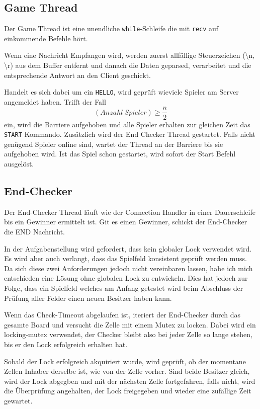 \subsection{Game Thread}
Der Game Thread ist eine unendliche \texttt{while}-Schleife die mit \texttt{recv} auf einkommende Befehle hört.

Wenn eine Nachricht Empfangen wird, werden zuerst allfällige Steuerzeichen (\textbackslash n, \textbackslash r) aus dem Buffer entfernt und danach die Daten geparsed, verarbeitet und die entsprechende Antwort an den Client geschickt.

Handelt es sich dabei um ein \texttt{HELLO}, wird geprüft wieviele Spieler am Server angemeldet haben. Trifft der Fall $$(Anzahl\ Spieler) \geq \frac{n}{2}$$ ein, wird die Barriere aufgehoben und alle Spieler erhalten zur gleichen Zeit das \texttt{START} Kommando. Zusätzlich wird der End Checker Thread gestartet. Falls nicht genügend Spieler online sind, wartet der Thread an der Barriere bis sie aufgehoben wird. Ist das Spiel schon gestartet, wird sofort der Start Befehl ausgelöst.


\subsection{End-Checker}
Der End-Checker Thread läuft wie der Connection Handler in einer Dauerschleife bis ein Gewinner ermittelt ist. Git es einen Gewinner, schickt der End-Checker die END Nachricht.

In der Aufgabenstellung wird gefordert, dass kein globaler Lock verwendet wird. Es wird aber auch verlangt, dass das Spielfeld konsistent geprüft werden muss. Da sich diese zwei Anforderungen jedoch nicht vereinbaren lassen, habe ich mich entschieden eine Lösung ohne globalen Lock zu entwickeln. Dies hat jedoch zur Folge, dass ein Spielfeld welches am Anfang getestet wird beim Abschluss der Prüfung aller Felder einen neuen Besitzer haben kann.

Wenn das Check-Timeout abgelaufen ist, iteriert der End-Checker durch das gesamte Board und versucht die Zelle mit einem Mutex zu locken. Dabei wird ein locking-mutex verwendet, der Checker bleibt also bei jeder Zelle so lange stehen, bis er den Lock erfolgreich erhalten hat. 

Sobald der Lock erfolgreich akquiriert wurde, wird geprüft, ob der momentane Zellen Inhaber derselbe ist, wie von der Zelle vorher. Sind beide Besitzer gleich, wird der Lock abgegben und mit der nächsten Zelle fortgefahren, falls nicht, wird die Überprüfung angehalten, der Lock freigegeben und wieder eine zufällige Zeit gewartet.


